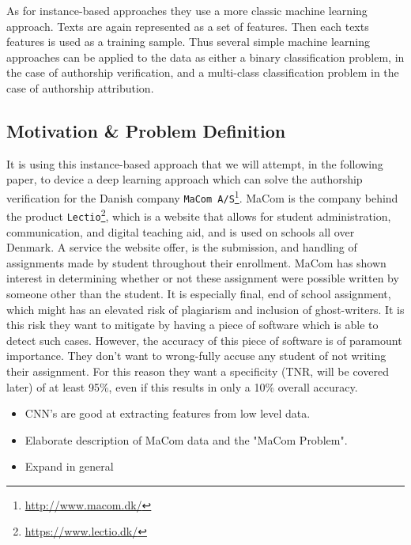 As for instance-based approaches they use a more classic machine learning
approach. Texts are again represented as a set of features. Then each texts
features is used as a training sample. Thus several simple machine learning
approaches can be applied to the data as either a binary classification problem,
in the case of authorship verification, and a multi-class classification problem
in the case of authorship attribution.

\subsection{Motivation \& Problem Definition} 

It is using this instance-based approach that we will attempt, in
the following paper, to device a deep learning approach which can
solve the authorship verification for the Danish company \texttt{MaCom
A/S}\footnote{\url{http://www.macom.dk/}}. MaCom is the company behind the
product \texttt{Lectio}\footnote{\url{https://www.lectio.dk/}}, which is a
website that allows for student administration, communication, and digital
teaching aid, and is used on schools all over Denmark. A service the website
offer, is the submission, and handling of assignments made by student throughout
their enrollment. MaCom has shown interest in determining whether or not these
assignment were possible written by someone other than the student. It is
especially final, end of school assignment, which might has an elevated risk of
plagiarism and inclusion of ghost-writers. It is this risk they want to mitigate
by having a piece of software which is able to detect such cases. However, the
accuracy of this piece of software is of paramount importance. They don't want
to wrong-fully accuse any student of not writing their assignment. For this
reason they want a specificity (\gls{TNR}, will be covered later) of at least
95\%, even if this results in only a 10\% overall accuracy.

\begin{itemize}
    \item CNN's are good at extracting features from low level data.
    \item Elaborate description of MaCom data and the "MaCom Problem".
    \item Expand in general
\end{itemize}
